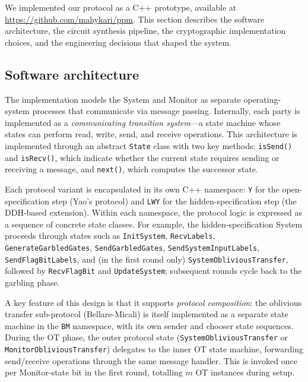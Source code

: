 We implemented our protocol as a C++ prototype, available at \url{https://github.com/mahykari/ppm}. This section describes the software architecture, the circuit synthesis pipeline, the cryptographic implementation choices, and the engineering decisions that shaped the system.

\subsection{Software architecture}\label{sec:architecture}

The implementation models the System and Monitor as separate operating-system processes that communicate via message passing. Internally, each party is implemented as a \emph{communicating transition system}---a state machine whose states can perform read, write, send, and receive operations. This architecture is implemented through an abstract \texttt{State} class with two key methods: \texttt{isSend()} and \texttt{isRecv()}, which indicate whether the current state requires sending or receiving a message, and \texttt{next()}, which computes the successor state.

Each protocol variant is encapsulated in its own C++ namespace: \texttt{Y} for the open-specification step (Yao's protocol) and \texttt{LWY} for the hidden-specification step (the DDH-based extension). Within each namespace, the protocol logic is expressed as a sequence of concrete state classes. For example, the hidden-specification System proceeds through states such as \texttt{InitSystem}, \texttt{RecvLabels}, \texttt{Generate\-Garbled\-Gates}, \texttt{Send\-Garbled\-Gates}, \texttt{Send\-System\-Input\-Labels}, \texttt{Send\-Flag\-Bit\-Labels}, and (in the first round only) \texttt{System\-Oblivious\-Transfer}, followed by \texttt{Recv\-Flag\-Bit} and \texttt{Update\-System}; subsequent rounds cycle back to the garbling phase.

A key feature of this design is that it supports \emph{protocol composition}: the oblivious transfer sub-protocol (Bellare-Micali) is itself implemented as a separate state machine in the \texttt{BM} namespace, with its own sender and chooser state sequences. During the OT phase, the outer protocol state (\texttt{SystemObliviousTransfer} or \texttt{MonitorObliviousTransfer}) delegates to the inner OT state machine, forwarding send/receive operations through the same message handler. This is invoked once per Monitor-state bit in the first round, totalling $m$ OT instances during setup.

